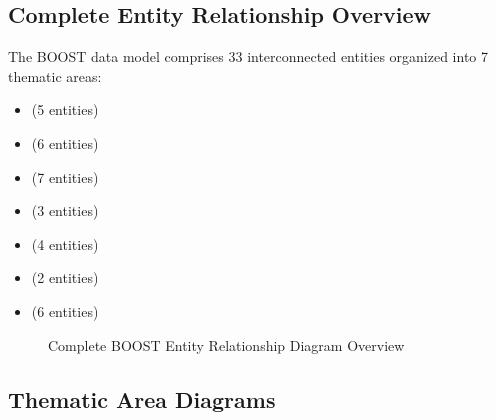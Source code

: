 
\subsection{Complete Entity Relationship Overview}
\label{sec:complete-erd-overview}

The BOOST data model comprises 33 interconnected entities organized into 7 thematic areas:

\begin{itemize}
    \item {} (5 entities)
    \item {} (6 entities)
    \item {} (7 entities)
    \item {} (3 entities)
    \item {} (4 entities)
    \item {} (2 entities)
    \item {} (6 entities)
\end{itemize}

\begin{figure}[H]
    \centering
    \caption{Complete BOOST Entity Relationship Diagram Overview}
    \label{fig:boost-erd-complete}
\end{figure}

\subsection{Thematic Area Diagrams}
\label{sec:thematic-area-diagrams}

